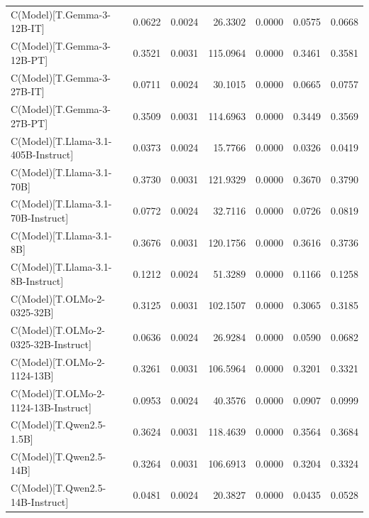 \documentclass{article} %
\begin{document}
\begin{table}
\begin{center}
\begin{tabular}{lrrrrrr}
C(Model)[T.Gemma-3-12B-IT]                             &  0.0622 &   0.0024 &   26.3302 &      0.0000 &  0.0575 &  0.0668  \\
C(Model)[T.Gemma-3-12B-PT]                             &  0.3521 &   0.0031 &  115.0964 &      0.0000 &  0.3461 &  0.3581  \\
C(Model)[T.Gemma-3-27B-IT]                             &  0.0711 &   0.0024 &   30.1015 &      0.0000 &  0.0665 &  0.0757  \\
C(Model)[T.Gemma-3-27B-PT]                             &  0.3509 &   0.0031 &  114.6963 &      0.0000 &  0.3449 &  0.3569  \\
C(Model)[T.Llama-3.1-405B-Instruct]                    &  0.0373 &   0.0024 &   15.7766 &      0.0000 &  0.0326 &  0.0419  \\
C(Model)[T.Llama-3.1-70B]                              &  0.3730 &   0.0031 &  121.9329 &      0.0000 &  0.3670 &  0.3790  \\
C(Model)[T.Llama-3.1-70B-Instruct]                     &  0.0772 &   0.0024 &   32.7116 &      0.0000 &  0.0726 &  0.0819  \\
C(Model)[T.Llama-3.1-8B]                               &  0.3676 &   0.0031 &  120.1756 &      0.0000 &  0.3616 &  0.3736  \\
C(Model)[T.Llama-3.1-8B-Instruct]                      &  0.1212 &   0.0024 &   51.3289 &      0.0000 &  0.1166 &  0.1258  \\
C(Model)[T.OLMo-2-0325-32B]                            &  0.3125 &   0.0031 &  102.1507 &      0.0000 &  0.3065 &  0.3185  \\
C(Model)[T.OLMo-2-0325-32B-Instruct]                   &  0.0636 &   0.0024 &   26.9284 &      0.0000 &  0.0590 &  0.0682  \\
C(Model)[T.OLMo-2-1124-13B]                            &  0.3261 &   0.0031 &  106.5964 &      0.0000 &  0.3201 &  0.3321  \\
C(Model)[T.OLMo-2-1124-13B-Instruct]                   &  0.0953 &   0.0024 &   40.3576 &      0.0000 &  0.0907 &  0.0999  \\
C(Model)[T.Qwen2.5-1.5B]                               &  0.3624 &   0.0031 &  118.4639 &      0.0000 &  0.3564 &  0.3684  \\
C(Model)[T.Qwen2.5-14B]                                &  0.3264 &   0.0031 &  106.6913 &      0.0000 &  0.3204 &  0.3324  \\
C(Model)[T.Qwen2.5-14B-Instruct]                       &  0.0481 &   0.0024 &   20.3827 &      0.0000 &  0.0435 &  0.0528  \\

\end{tabular}
\end{center}
\end{table}
\end{document}
